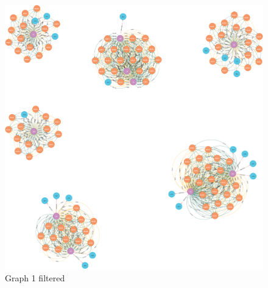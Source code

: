 \begin{landscape}
  \begin{figure}[H]
    \includegraphics[scale=0.18]{img/Neo4j/graph0-filter.png}
    \centering
    \caption{Graph 1 filtered}
    \label{fig:Graph 1 filtered}
  \end{figure}
\end{landscape}

